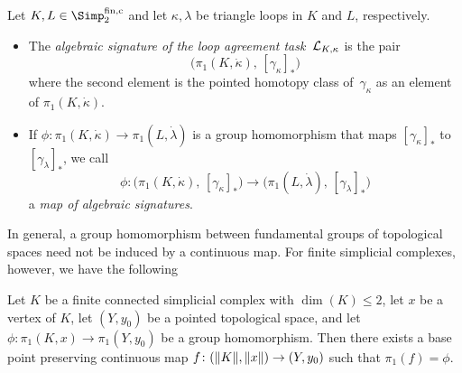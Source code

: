 \begin{thDef}
    Let $K,L\in\finSimp$ and let $\kappa,\lambda$ be triangle loops in
    $K$ and $L$, respectively.
    \begin{itemize}
        \item
            The \emph{algebraic signature %
                      of the loop agreement task~$\mathcal{L}_{K,\kappa}$}
            is the pair
            \[ \bigl( \pi_1(K,\dot\kappa), \, [\gamma_\kappa]_\ast \bigr) \]
            where the second element is the pointed homotopy class
            of~$\gamma_\kappa$ as an element of $\pi_1(K,\dot\kappa)$.
            
        \item
            If $\phi\colon\pi_1(K,\dot\kappa)\to\pi_1(L,\dot\lambda)$ is a
            group homomorphism that maps $[\gamma_\kappa]_\ast$ to
            $[\gamma_\lambda]_\ast$, we call
            \[ \phi\colon \bigl( \pi_1(K,\dot\kappa), \, [\gamma_\kappa]_\ast \bigr)
                \to \bigl( \pi_1(L,\dot\lambda), \, [\gamma_\lambda]_\ast \bigr)
            \]
            a \emph{map of algebraic signatures}.
    \end{itemize}
\end{thDef}

In general, a group homomorphism between fundamental groups of topological spaces
need not be induced by a continuous map. For finite simplicial complexes,
however, we have the following

\begin{thLemma}
    \label{ch3:continuousrealization}
    Let $K$ be a finite connected simplicial complex with $\dim(K)\leq 2$, let
    $x$ be a vertex of $K$, let $(Y,y_0)$ be a pointed topological space, and
    let $\phi\colon\pi_1(K,x)\to\pi_1(Y,y_0)$ be a group homomorphism.
    Then there exists a base point preserving continuous map
    $f\colon(\lVert K\rVert,\lVert x\rVert)\to(Y,y_0)$ such that $\pi_1(f) = \phi$.
\end{thLemma}

